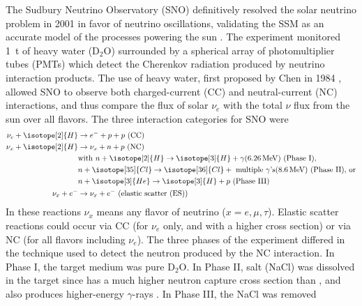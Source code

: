 The Sudbury Neutrino Observatory (SNO) definitively resolved
the solar neutrino problem in 2001 in favor of neutrino oscillations,
validating the SSM as an accurate model of the processes powering the sun
\cite{sno2001}.
The experiment monitored \SI{1}{\tonne} of heavy water ($\text{D}_2\text{O}$)
surrounded by a spherical array of photomultiplier tubes (PMTs)
which detect the Cherenkov radiation produced by neutrino interaction products.
The use of heavy water, first proposed by Chen in 1984 \cite{chen_d2o},
allowed SNO to observe both charged-current (CC)
and neutral-current (NC) interactions,
and thus compare the flux of solar $\nu_e$ with the total $\nu$ flux
from the sun over all flavors.
The three interaction categories for SNO were
\begin{align}\label{eq:sno_interactions}
    \begin{split}
        \nu_e + \isotope[2]{H} & \to e^- + p + p \text{ (CC)} \\
        \nu_x + \isotope[2]{H} & \to \nu_x + n + p  \text{ (NC)}\\
                               & \text{with }n + \isotope[2]{H} \to
                               \isotope[3]{H} + \gamma (\SI{6.26}{\MeV})
                               \text{ (Phase I),} \\
                               & n + \isotope[35]{Cl} \to
                               \isotope[36]{Cl} + \text{ multiple }\gamma\text{'s}
                               (\SI{8.6}{\MeV})
                               \text{ (Phase II), or} \\
                               & n + \isotope[3]{He} \to
                               \isotope[3]{H} + p \text{ (Phase III)}\\
        \nu_x + e^- & \to \nu_x + e^- \text{ (elastic scatter (ES))}
    \end{split}
\end{align}
In these reactions $\nu_x$ means any flavor of neutrino ($x = e,\mu,\tau$).
Elastic scatter reactions could occur via CC (for $\nu_e$ only, and with a higher cross section)
or via NC (for all flavors including $\nu_e$).
The three phases of the experiment differed in the technique
used to detect the neutron produced by the NC interaction.
In Phase I, the target medium was pure $\text{D}_2\text{O}$.
In Phase II, salt (NaCl) was dissolved in the target
since  has a much higher neutron capture cross section
than , and also produces higher-energy $\gamma$-rays \cite{sno_salt2004}.
In Phase III, the NaCl was removed
